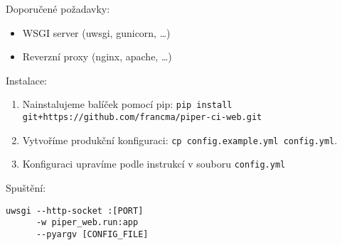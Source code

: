 Doporučené požadavky:

\begin{itemize}
	\item WSGI server (uwsgi, gunicorn, \ldots)
	\item Reverzní proxy (nginx, apache, \ldots)
\end{itemize}

Instalace:

\begin{enumerate}
	\item Nainstalujeme balíček pomocí pip: \newline
		\verb|pip install git+https://github.com/francma/piper-ci-web.git|
	\item Vytvoříme produkční konfiguraci: \newline
		\verb|cp config.example.yml config.yml|.
	\item Konfiguraci upravíme podle instrukcí v souboru \verb|config.yml|
\end{enumerate}

Spuštění:
\begin{listing}[H]
\begin{verbatim}
uwsgi --http-socket :[PORT] 
      -w piper_web.run:app
      --pyargv [CONFIG_FILE]
\end{verbatim}
\end{listing}